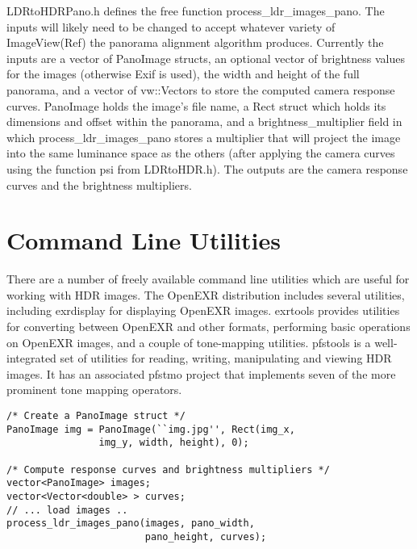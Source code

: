LDRtoHDRPano.h defines the free function
process\_ldr\_images\_pano. The inputs will likely need to be changed
to accept whatever variety of ImageView(Ref) the panorama alignment
algorithm produces. Currently the inputs are a vector of PanoImage
structs, an optional vector of brightness values for the images
(otherwise Exif is used), the width and height of the full panorama,
and a vector of vw::Vectors to store the computed camera response
curves. PanoImage holds the image's file name, a Rect struct which
holds its dimensions and offset within the panorama, and a
brightness\_multiplier field in which process\_ldr\_images\_pano
stores a multiplier that will project the image into the same
luminance space as the others (after applying the camera curves using
the function psi from LDRtoHDR.h). The outputs are the camera response
curves and the brightness multipliers.

\section{Command Line Utilities}
There are a number of freely available command line utilities which are useful for working
with HDR images. The OpenEXR distribution \cite{openexr} includes several utilities,
including exrdisplay for displaying OpenEXR images. exrtools \cite{exrtools} provides
utilities for converting between OpenEXR and other formats, performing basic operations
on OpenEXR images, and a couple of tone-mapping utilities. pfstools \cite{pfstools} is a
well-integrated set of utilities for reading, writing, manipulating and viewing HDR images.
It has an associated pfstmo project that implements seven of the more prominent tone
mapping operators.

\begin{verbatim}
/* Create a PanoImage struct */
PanoImage img = PanoImage(``img.jpg'', Rect(img_x,
                img_y, width, height), 0);

/* Compute response curves and brightness multipliers */
vector<PanoImage> images;
vector<Vector<double> > curves;
// ... load images ..
process_ldr_images_pano(images, pano_width,
                        pano_height, curves);
\end{verbatim}

